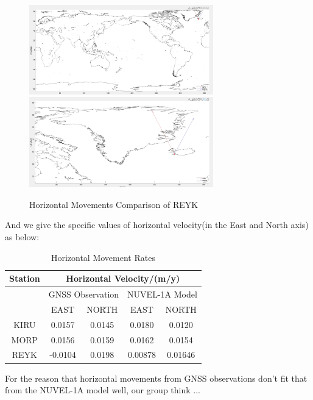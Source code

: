 \documentclass{article}
\begin{document}
  \begin{figure}[H]
    \centering
    {
    \includegraphics[width=8cm]{../result/re_figure/fig_REYK/截屏/figure4_new.jpg}}
    \hspace{3pt}    
    {
    \includegraphics[width=8cm]{../result/re_figure/fig_REYK/截屏/figure4(zoomup).jpg}}
    \caption{Horizontal Movements Comparison of REYK}
    \label{fig:Vel_REYK}
  \end{figure}

And we give the specific values of horizontal velocity(in the East and North axis) as below:
\vspace{6pt}
\begin{table}[htbp]
  \centering
  \caption{Horizontal Movement Rates}
    \begin{tabular}{ccc|cc}
    \large Station & \multicolumn{4}{c}{\large Horizontal Velocity/(m/y)} \\[5pt]
    \midrule
          & \multicolumn{2}{c}{GNSS Observation} & \multicolumn{2}{c}{NUVEL-1A Model} \\[3pt]
          & EAST  & \multicolumn{1}{c}{NORTH} & EAST  &  NORTH \\[4pt]
    \large KIRU  & 0.0157 & 0.0145 & 0.0180 & 0.0120 \\[4pt]
    \large MORP  &  0.0156 & 0.0159 &  0.0162 & 0.0154 \\[4pt]
    \large REYK  & -0.0104 & 0.0198 &  0.00878 & 0.01646 \\
    \end{tabular}%
  \label{tab:Hori_vel}%
\end{table}%

For the reason that horizontal movements from GNSS observations don't fit that from the NUVEL-1A model well,
our group think ...
\end{document}
